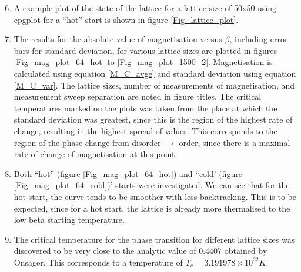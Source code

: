 \documentclass[a4paper]{article}
\begin{document}
\clearpage
\begin{enumerate}
	\setcounter{enumi}{5}
	\item A example plot of the state of the lattice for a lattice size of 50x50 using cpgplot for a ``hot'' start is shown in figure \ref{Fig_lattice_plot}.

	\item The results for the absolute value of magnetisation versus $\beta$, including error bars for standard deviation, for various lattice sizes are plotted in figures \ref{Fig_mag_plot_64_hot} to \ref{Fig_mag_plot_1500_2}. Magnetisation is calculated using equation \ref{M_C_avge} and standard deviation using equation \ref{M_C_var}. The lattice sizes, number of measurements of magnetisation, and measurement sweep separation are noted in figure titles. The critical temperatures marked on the plots was taken from the place at which the standard deviation was greatest, since this is the region of the highest rate of change, resulting in the highest spread of values. This corresponds to the region of the phase change from disorder $\rightarrow$ order, since there is a maximal rate of change of magnetisation at this point.
	
	\item Both ``hot'' (figure \ref{Fig_mag_plot_64_hot}) and ``cold' (figure \ref{Fig_mag_plot_64_cold})' starts were investigated. We can see that for the hot start, the curve tends to be smoother with less backtracking. This is to be expected, since for a hot start, the lattice is already more thermalised to the low beta starting temperature. 
	
	\item The critical temperature for the phase transition for different lattice sizes was discovered to be very close to the analytic value of 0.4407 obtained by Onsager. This corresponds to a temperature of $T_c=3.191978\times10^{22} K$.
	

\end{enumerate}
\end{document}

